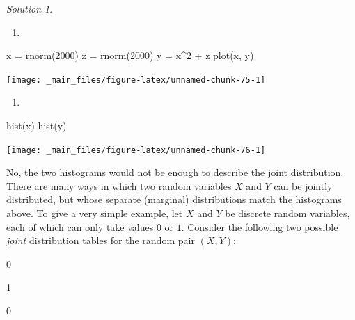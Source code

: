 \documentclass[
]{book}
\newenvironment{Shaded}{\begin{snugshade}}{\end{snugshade}}
\newcommand{\DecValTok}[1]{\textcolor[rgb]{0.00,0.00,0.81}{#1}}
\newcommand{\FunctionTok}[1]{\textcolor[rgb]{0.00,0.00,0.00}{#1}}
\newcommand{\NormalTok}[1]{#1}
\newcommand{\OtherTok}[1]{\textcolor[rgb]{0.56,0.35,0.01}{#1}}
\newcommand{\SpecialCharTok}[1]{\textcolor[rgb]{0.00,0.00,0.00}{#1}}
\providecommand{\tightlist}{%
  \setlength{\itemsep}{0pt}\setlength{\parskip}{0pt}}
\theoremstyle{definition}
\theoremstyle{definition}
\theoremstyle{definition}
\theoremstyle{definition}
\theoremstyle{remark}
\newtheorem*{solution}{Solution}
\begin{document}
\begin{solution}
~

\begin{enumerate}
\def\labelenumi{\arabic{enumi}.}
\tightlist
\item
\end{enumerate}

\begin{Shaded}
\begin{Highlighting}[]
\NormalTok{x }\OtherTok{=} \FunctionTok{rnorm}\NormalTok{(}\DecValTok{2000}\NormalTok{)}
\NormalTok{z }\OtherTok{=} \FunctionTok{rnorm}\NormalTok{(}\DecValTok{2000}\NormalTok{)}
\NormalTok{y }\OtherTok{=}\NormalTok{ x}\SpecialCharTok{\^{}}\DecValTok{2} \SpecialCharTok{+}\NormalTok{ z}
\FunctionTok{plot}\NormalTok{(x, y)}
\end{Highlighting}
\end{Shaded}

\begin{center}\texttt{[image: \_main\_files/figure-latex/unnamed-chunk-75-1]} \end{center}

\begin{enumerate}
\def\labelenumi{\arabic{enumi}.}
\setcounter{enumi}{1}
\tightlist
\item
\end{enumerate}

\begin{Shaded}
\begin{Highlighting}[]
\FunctionTok{hist}\NormalTok{(x)}
\FunctionTok{hist}\NormalTok{(y)}
\end{Highlighting}
\end{Shaded}

\begin{center}\texttt{[image: \_main\_files/figure-latex/unnamed-chunk-76-1]} \end{center}

No, the two histograms would not be enough to describe the joint distribution.
There are many ways in which two random variables \(X\) and \(Y\) can be jointly
distributed, but whose separate (marginal) distributions match the histograms
above. To give a very simple example, let \(X\) and \(Y\) be discrete random
variables, each of which can only take values \(0\) or \(1\). Consider the following
two possible \emph{joint} distribution tables for the random pair \((X,Y)\):

0

1

0


\end{solution}
\end{document}
